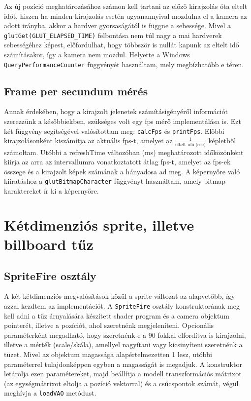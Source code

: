 Az új pozíció meghatározásához számon kell tartani az előző kirajzolás óta eltelt időt, hiszen ha minden kirajzolás esetén ugyanannyival mozdulna el a kamera az adott irányba, akkor a hardver gyorsaságától is függne a sebessége. Mivel a \texttt{glutGet(GLUT\_ELAPSED\_TIME)} felbontása nem túl nagy a mai hardverek sebességéhez képest, előfordulhat, hogy többször is nullát kapunk az eltelt idő számításakor, így a kamera nem mozdul. Helyette a Windows \texttt{QueryPerformanceCounter} függvényét használtam, mely megbízhatóbb e téren.

\subsection{Frame per secundum mérés}

Annak érdekében, hogy a kirajzolt jelenetek számításigényéről információt szerezzünk a későbbiekben, szükséges volt egy fps mérő implementálása is. Ezt két függvény segítségével valósítottam meg: \texttt{calcFps} és \texttt{printFps}. Előbbi kirajzolásonként kiszámítja az aktuális fps-t, amelyet az $\frac{1}{\text{eltelt idő (sec)}}$ képletből számoltam. Utóbbi a refreshTime változóban (ms) meghatározott időközönként kiírja az arra az intervallumra vonatkoztatott átlag fps-t, amelyet az fps-ek összege és a kirajzolt képek számának a hányadosa ad meg. A képernyőre való kiíratáshoz a \texttt{glutBitmapCharacter} függvényt használtam, amely bitmap karaktereket ír ki a képernyőre. 

\section{Kétdimenziós sprite, illetve billboard tűz}

\subsection{SpriteFire osztály}

A két kétdimenziós megvalósítások közül a sprite változat az alapvetőbb, így azzal kezdtem az implementációt. A \texttt{SpriteFire} osztály konstruktorának meg kell adni a tűz árnyalására készített shader program és a camera objektum pointerét, illetve a pozíciót, ahol szeretnénk megjeleníteni. Opcionális paraméterként megadható, hogy szeretnénk-e a 90 fokkal elfordítva is kirajzolni, illetve a mérték (scale/skála), amellyel nagyítani vagy kicsinyíteni szeretnénk a tüzet. Mivel az objektum magassága alapértelmezetten 1 lesz, utóbbi paraméterrel tulajdonképpen egyben a magasságát is megadjuk. A konstruktor letárolja ezen paramétereket, majd beállítja a modell transzformációs mátrixot (az egységmátrixot eltolja a pozíció vektorral) és a csúcspontok számát, végül meghívja a \texttt{loadVAO} metódust.

